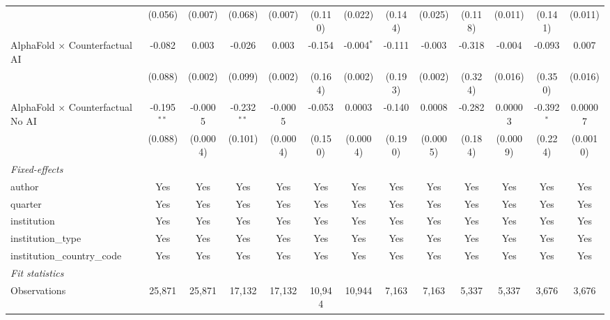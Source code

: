 \begin{tabular}{lcccccccccccc}
                                            & (0.056)       & (0.007)  & (0.068)       & (0.007)  & (0.110)      & (0.022)      & (0.144) & (0.025)  & (0.118) & (0.011)  & (0.141)      & (0.011)\\   
   AlphaFold $\times$ Counterfactual AI     & -0.082        & 0.003    & -0.026        & 0.003    & -0.154       & -0.004$^{*}$ & -0.111  & -0.003   & -0.318  & -0.004   & -0.093       & 0.007\\   
                                            & (0.088)       & (0.002)  & (0.099)       & (0.002)  & (0.164)      & (0.002)      & (0.193) & (0.002)  & (0.324) & (0.016)  & (0.350)      & (0.016)\\   
   AlphaFold $\times$ Counterfactual No AI  & -0.195$^{**}$ & -0.0005  & -0.232$^{**}$ & -0.0005  & -0.053       & 0.0003       & -0.140  & 0.0008   & -0.282  & 0.00003  & -0.392$^{*}$ & 0.00007\\   
                                            & (0.088)       & (0.0004) & (0.101)       & (0.0004) & (0.150)      & (0.0004)     & (0.190) & (0.0005) & (0.184) & (0.0009) & (0.224)      & (0.0010)\\   
   \midrule
   \emph{Fixed-effects}\\
   author                                   & Yes           & Yes      & Yes           & Yes      & Yes          & Yes          & Yes     & Yes      & Yes     & Yes      & Yes          & Yes\\  
   quarter                                  & Yes           & Yes      & Yes           & Yes      & Yes          & Yes          & Yes     & Yes      & Yes     & Yes      & Yes          & Yes\\  
   institution                              & Yes           & Yes      & Yes           & Yes      & Yes          & Yes          & Yes     & Yes      & Yes     & Yes      & Yes          & Yes\\  
   institution\_type                        & Yes           & Yes      & Yes           & Yes      & Yes          & Yes          & Yes     & Yes      & Yes     & Yes      & Yes          & Yes\\  
   institution\_country\_code               & Yes           & Yes      & Yes           & Yes      & Yes          & Yes          & Yes     & Yes      & Yes     & Yes      & Yes          & Yes\\  
   \midrule
   \emph{Fit statistics}\\
   Observations                             & 25,871        & 25,871   & 17,132        & 17,132   & 10,944       & 10,944       & 7,163   & 7,163    & 5,337   & 5,337    & 3,676        & 3,676\\  

\end{tabular}
